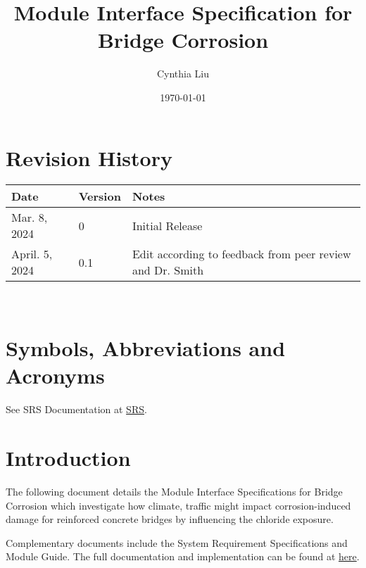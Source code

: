 \documentclass[12pt, titlepage]{article}
\begin{document}
\title{Module Interface Specification for Bridge Corrosion}

\author{Cynthia Liu}

\date{\today}

\maketitle


\section{Revision History}

\begin{tabularx}{\textwidth}{p{3cm}p{2cm}X}
\toprule {\bf Date} & {\bf Version} & {\bf Notes}\\
\midrule
Mar. 8, 2024 & 0 & Initial Release\\
April. 5, 2024 & 0.1 & Edit according to feedback from peer review and Dr. Smith\\
\bottomrule
\end{tabularx}

~\newpage

\section{Symbols, Abbreviations and Acronyms}

See SRS Documentation at \href{https://github.com/CynthiaLiu0805/BridgeCorrosion/blob/main/docs/SRS/SRS.pdf}{SRS}.


\newpage

\tableofcontents

\newpage


\section{Introduction}

The following document details the Module Interface Specifications for Bridge Corrosion which investigate how climate, traffic might impact corrosion-induced
damage for reinforced concrete bridges by influencing the chloride exposure.

Complementary documents include the System Requirement Specifications
and Module Guide.  The full documentation and implementation can be
found at \href{https://github.com/CynthiaLiu0805/BridgeCorrosion}{here}.
\end{document}
